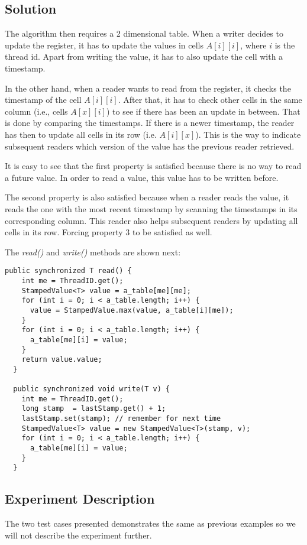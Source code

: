 \subsection{Solution}
The algorithm then requires a 2 dimensional table. When a writer decides to
update the register, it has to update the values in cells $A[i][i]$, where $i$
is the thread id. Apart from writing the value, it has to also update the cell
with a timestamp. 
\par
In the other hand, when a reader wants to read from the register, it checks the
timestamp of the cell $A[i][i]$. After that, it has to check other cells in the
same column (i.e., cells $A[x][i]$) to see if there has been an update in between.
That is done by comparing the timestamps. If there is a newer timestamp, the
reader has then to update all cells in its row (i.e. $A[i][x]$). This is the way
to indicate subsequent readers which version of the value has the previous
reader retrieved.
\par
It is easy to see that the first property is satisfied because there is no way
to read a future value. In order to read a value, this value has to be written
before.
\par
The second property is also satisfied because when a reader reads the value, it
reads the one with the most recent timestamp by scanning the timestamps in its
corresponding column. This reader also helps subsequent readers by updating all
cells in its row. Forcing property 3 to be satisfied as well.
\par
The \textit{read()} and \textit{write()} methods are shown next:
\par
\begin{lstlisting}[style=numbers]
  public synchronized T read() {
    int me = ThreadID.get();
    StampedValue<T> value = a_table[me][me];
    for (int i = 0; i < a_table.length; i++) {
      value = StampedValue.max(value, a_table[i][me]);
    }
    for (int i = 0; i < a_table.length; i++) {
      a_table[me][i] = value;
    }
    return value.value;
  }

  public synchronized void write(T v) {
    int me = ThreadID.get();
    long stamp  = lastStamp.get() + 1;
    lastStamp.set(stamp); // remember for next time
    StampedValue<T> value = new StampedValue<T>(stamp, v);
    for (int i = 0; i < a_table.length; i++) {
      a_table[me][i] = value;
    }
  }
\end{lstlisting}
\hfill
\subsection{Experiment Description}
\par 
The two test cases presented demonstrates the same as previous examples so we
will not describe the experiment further. 
\par
